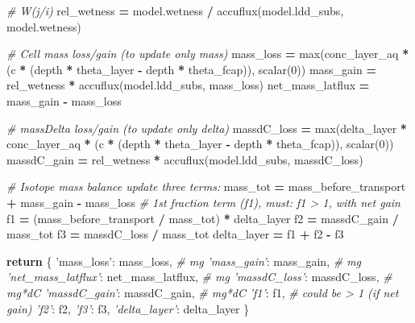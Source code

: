 \documentclass[]{article}
\newenvironment{Shaded}{\begin{snugshade}}{\end{snugshade}}
\newcommand{\DecValTok}[1]{\textcolor[rgb]{0.00,0.00,0.81}{{#1}}}
\newcommand{\StringTok}[1]{\textcolor[rgb]{0.31,0.60,0.02}{{#1}}}
\newcommand{\CommentTok}[1]{\textcolor[rgb]{0.56,0.35,0.01}{\textit{{#1}}}}
\newcommand{\ControlFlowTok}[1]{\textcolor[rgb]{0.13,0.29,0.53}{\textbf{{#1}}}}
\newcommand{\OperatorTok}[1]{\textcolor[rgb]{0.81,0.36,0.00}{\textbf{{#1}}}}
\newcommand{\BuiltInTok}[1]{{#1}}
\newcommand{\NormalTok}[1]{{#1}}
\begin{document}
\begin{Shaded}
\begin{Highlighting}[]
    \CommentTok{# W(j/i)}
    \NormalTok{rel_wetness }\OperatorTok{=} \NormalTok{model.wetness }\OperatorTok{/} \NormalTok{accuflux(model.ldd_subs, model.wetness)}

    \CommentTok{# Cell mass loss/gain (to update only mass)}
    \NormalTok{mass_loss }\OperatorTok{=} \BuiltInTok{max}\NormalTok{(conc_layer_aq }\OperatorTok{*} \NormalTok{(c }\OperatorTok{*} \NormalTok{(depth }\OperatorTok{*} \NormalTok{theta_layer }\OperatorTok{-} \NormalTok{depth }\OperatorTok{*} \NormalTok{theta_fcap)), scalar(}\DecValTok{0}\NormalTok{))}
    \NormalTok{mass_gain }\OperatorTok{=} \NormalTok{rel_wetness }\OperatorTok{*} \NormalTok{accuflux(model.ldd_subs, mass_loss)}
    \NormalTok{net_mass_latflux }\OperatorTok{=} \NormalTok{mass_gain }\OperatorTok{-} \NormalTok{mass_loss}

    \CommentTok{# massDelta  loss/gain (to update only delta)}
    \NormalTok{massdC_loss }\OperatorTok{=} \BuiltInTok{max}\NormalTok{(delta_layer }\OperatorTok{*} \NormalTok{conc_layer_aq }\OperatorTok{*} \NormalTok{(c }\OperatorTok{*} \NormalTok{(depth }\OperatorTok{*} \NormalTok{theta_layer }\OperatorTok{-} \NormalTok{depth }\OperatorTok{*} \NormalTok{theta_fcap)), scalar(}\DecValTok{0}\NormalTok{))}
    \NormalTok{massdC_gain }\OperatorTok{=} \NormalTok{rel_wetness }\OperatorTok{*} \NormalTok{accuflux(model.ldd_subs, massdC_loss)}

    \CommentTok{# Isotope mass balance update three terms:}
    \NormalTok{mass_tot }\OperatorTok{=} \NormalTok{mass_before_transport }\OperatorTok{+} \NormalTok{mass_gain }\OperatorTok{-} \NormalTok{mass_loss}
    \CommentTok{# 1st fraction term (f1), must: f1 > 1, with net gain}
    \NormalTok{f1 }\OperatorTok{=} \NormalTok{(mass_before_transport }\OperatorTok{/} \NormalTok{mass_tot) }\OperatorTok{*} \NormalTok{delta_layer}
    \NormalTok{f2 }\OperatorTok{=} \NormalTok{massdC_gain }\OperatorTok{/} \NormalTok{mass_tot}
    \NormalTok{f3 }\OperatorTok{=} \NormalTok{massdC_loss }\OperatorTok{/} \NormalTok{mass_tot}
    \NormalTok{delta_layer }\OperatorTok{=} \NormalTok{f1 }\OperatorTok{+} \NormalTok{f2 }\OperatorTok{-} \NormalTok{f3}

    \ControlFlowTok{return} \NormalTok{\{}
        \StringTok{'mass_loss'}\NormalTok{: mass_loss,  }\CommentTok{# mg}
        \CommentTok{'mass_gain'}\NormalTok{: mass_gain,  }\CommentTok{# mg}
        \CommentTok{'net_mass_latflux'}\NormalTok{: net_mass_latflux,  }\CommentTok{# mg}
        \CommentTok{'massdC_loss'}\NormalTok{: massdC_loss,  }\CommentTok{# mg*dC}
        \CommentTok{'massdC_gain'}\NormalTok{: massdC_gain,  }\CommentTok{# mg*dC}
        \CommentTok{'f1'}\NormalTok{: f1,  }\CommentTok{# could be > 1  (if net gain)}
        \CommentTok{'f2'}\NormalTok{: f2,}
        \CommentTok{'f3'}\NormalTok{: f3,}
        \CommentTok{'delta_layer'}\NormalTok{: delta_layer}
    \NormalTok{\}}
                       
\end{Highlighting}
\end{Shaded}
\end{document}
